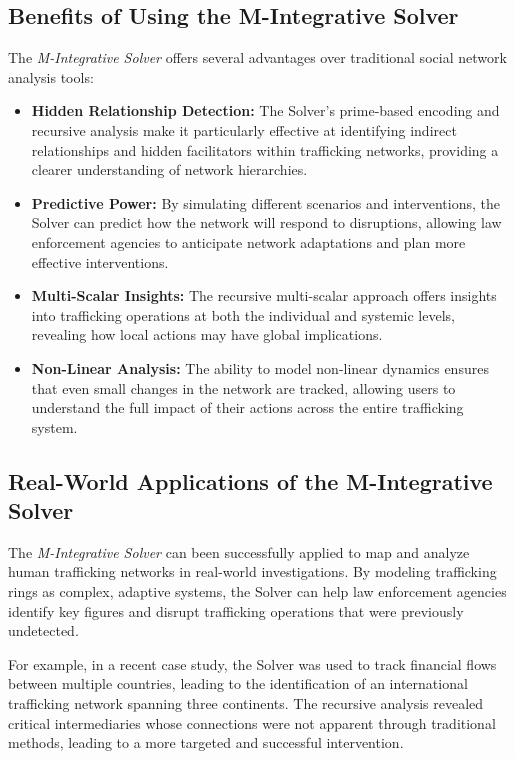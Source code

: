 \documentclass[%
 preprint, linenumbers,
 amsmath,amssymb,
 aps, physrev,
]{revtex4-2}
\begin{document}
\subsection{Benefits of Using the M-Integrative Solver}
The \textit{M-Integrative Solver} offers several advantages over traditional social network analysis tools:
\begin{itemize}
    \item \textbf{Hidden Relationship Detection:} The Solver's prime-based encoding and recursive analysis make it particularly effective at identifying indirect relationships and hidden facilitators within trafficking networks, providing a clearer understanding of network hierarchies.
    \item \textbf{Predictive Power:} By simulating different scenarios and interventions, the Solver can predict how the network will respond to disruptions, allowing law enforcement agencies to anticipate network adaptations and plan more effective interventions.
    \item \textbf{Multi-Scalar Insights:} The recursive multi-scalar approach offers insights into trafficking operations at both the individual and systemic levels, revealing how local actions may have global implications.
    \item \textbf{Non-Linear Analysis:} The ability to model non-linear dynamics ensures that even small changes in the network are tracked, allowing users to understand the full impact of their actions across the entire trafficking system.
\end{itemize}

\subsection{Real-World Applications of the M-Integrative Solver}
The \textit{M-Integrative Solver} can been successfully applied to map and analyze human trafficking networks in real-world investigations. By modeling trafficking rings as complex, adaptive systems, the Solver can help law enforcement agencies identify key figures and disrupt trafficking operations that were previously undetected. 

For example, in a recent case study, the Solver was used to track financial flows between multiple countries, leading to the identification of an international trafficking network spanning three continents. The recursive analysis revealed critical intermediaries whose connections were not apparent through traditional methods, leading to a more targeted and successful intervention.
\end{document}
